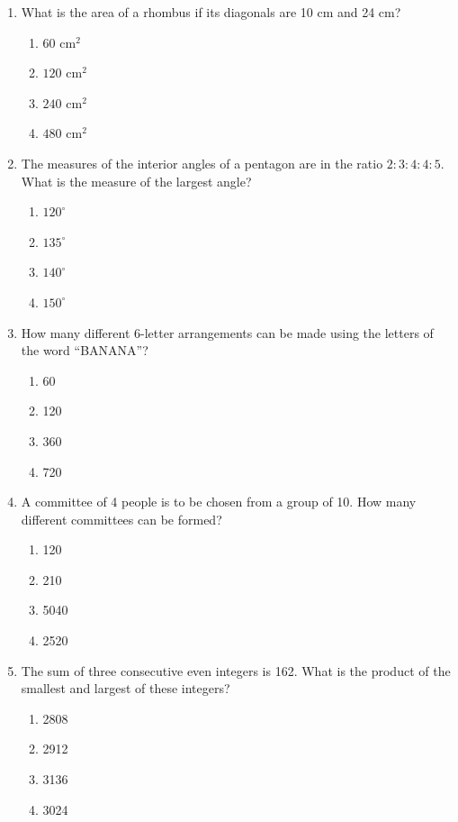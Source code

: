 \documentclass[12pt]{article}
\begin{document}
\begin{enumerate}
    \item What is the area of a rhombus if its diagonals are 10 cm and 24 cm?
    \begin{enumerate}
        \item $60\text{ cm}^2$
        \item $120\text{ cm}^2$
        \item $240\text{ cm}^2$
        \item $480\text{ cm}^2$
    \end{enumerate}

    \item The measures of the interior angles of a pentagon are in the ratio $2:3:4:4:5$. What is the measure of the largest angle?
    \begin{enumerate}
        \item $120^\circ$
        \item $135^\circ$
        \item $140^\circ$
        \item $150^\circ$
    \end{enumerate}

    \item How many different 6-letter arrangements can be made using the letters of the word ``BANANA''?
    \begin{enumerate}
        \item 60
        \item 120
        \item 360
        \item 720
    \end{enumerate}

    \item A committee of 4 people is to be chosen from a group of 10. How many different committees can be formed?
    \begin{enumerate}
        \item 120
        \item 210
        \item 5040
        \item 2520
    \end{enumerate}

    \item The sum of three consecutive even integers is 162. What is the product of the smallest and largest of these integers?
    \begin{enumerate}
        \item 2808
        \item 2912
        \item 3136
        \item 3024
    \end{enumerate}


\end{enumerate}
\end{document}
